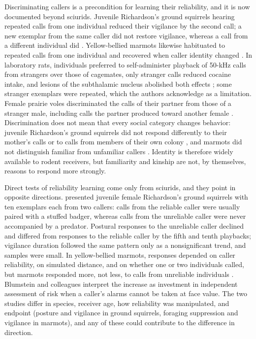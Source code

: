 Discriminating callers is a precondition for learning their reliability, and it is now documented beyond sciurids. Juvenile Richardson's ground squirrels hearing repeated calls from one individual reduced their vigilance by the second call; a new exemplar from the same caller did not restore vigilance, whereas a call from a different individual did \citep{Hare1998}. Yellow-bellied marmots likewise habituated to repeated calls from one individual and recovered when caller identity changed \citep{BlumsteinDaniel2004}. In laboratory rats, individuals preferred to self-administer playback of 50-kHz calls from strangers over those of cagemates, only stranger calls reduced cocaine intake, and lesions of the subthalamic nucleus abolished both effects \citep{VielleEtAl2021}; some stranger exemplars were repeated, which the authors acknowledge as a limitation.
Female prairie voles discriminated the calls of their partner from those of a stranger male, including calls the partner produced toward another female \citep{WarrenEtAl2025}.
Discrimination does not mean that every social category changes behavior: juvenile Richardson's ground squirrels did not respond differently to their mother's calls or to calls from members of their own colony \citep{HareWarkentin2012}, and marmots did not distinguish familiar from unfamiliar callers \citep{BlumsteinDaniel2004}.
Identity is therefore widely available to rodent receivers, but familiarity and kinship are not, by themselves, reasons to respond more strongly.

Direct tests of reliability learning come only from sciurids, and they point in opposite directions. \citet{HareAtkins2001} presented juvenile female Richardson's ground squirrels with ten exemplars each from two callers: calls from the reliable caller were usually paired with a stuffed badger, whereas calls from the unreliable caller were never accompanied by a predator. Postural responses to the unreliable caller declined and differed from responses to the reliable caller by the fifth and tenth playbacks; vigilance duration followed the same pattern only as a nonsignificant trend, and samples were small. In yellow-bellied marmots, responses depended on caller reliability, on simulated distance, and on whether one or two individuals called, but marmots responded more, not less, to calls from unreliable individuals \citep{BlumsteinEtAl2004}. Blumstein and colleagues interpret the increase as investment in independent assessment of risk when a caller's alarms cannot be taken at face value. The two studies differ in species, receiver age, how reliability was manipulated, and endpoint (posture and vigilance in ground squirrels, foraging suppression and vigilance in marmots), and any of these could contribute to the difference in direction.

